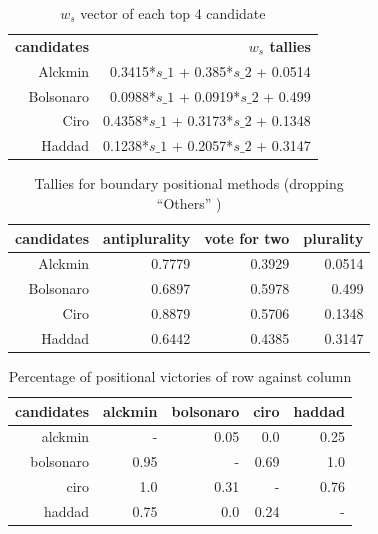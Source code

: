 \documentclass[hidelinks,11pt]{article}
\begin{document}
\begin{table}
  \centering
  \begin{tabular}{rr}
    \hline\hline
    \textbf{candidates} & \textbf{\(w_s\) tallies} \\
    Alckmin & 0.3415*\(s\_1\) + 0.385*\(s\_2\) + 0.0514 \\
    Bolsonaro & 0.0988*\(s\_1\) + 0.0919*\(s\_2\) + 0.499 \\
    Ciro & 0.4358*\(s\_1\) + 0.3173*\(s\_2\) + 0.1348 \\
    Haddad & 0.1238*\(s\_1\) + 0.2057*\(s\_2\) + 0.3147 \\\hline\hline
  \end{tabular}
  \caption{\(w_{s}\) vector of each top 4 candidate}
\end{table}


\begin{table}[]
    \centering
\begin{tabular}{|r|r|r|r|}
\hline
\textbf{candidates} & \textbf{antiplurality} & \textbf{vote for two} & \textbf{plurality} \\ \hline
Alckmin             & 0.7779                 & 0.3929                & 0.0514             \\ \hline
Bolsonaro           & 0.6897                 & 0.5978                & 0.499              \\ \hline
Ciro                & 0.8879                 & 0.5706                & 0.1348             \\ \hline
Haddad              & 0.6442                 & 0.4385                & 0.3147             \\ \hline
\end{tabular}
\caption{Tallies for boundary positional methods (dropping ``Others'' )}
\end{table}




\begin{table}[]
  \centering
\begin{tabular}{|r|r|r|r|r|}
\hline
\textbf{candidates} & \textbf{alckmin} & \textbf{bolsonaro} & \textbf{ciro} & \textbf{haddad} \\ \hline
alckmin             & -             & 0.05               & 0.0           & 0.25            \\ \hline
bolsonaro           & 0.95             & -            & 0.69          & 1.0             \\ \hline
ciro                & 1.0              & 0.31               & -           & 0.76            \\ \hline
haddad              & 0.75             & 0.0                & 0.24          & -            \\ \hline
\end{tabular}
\caption{Percentage of positional victories of row against column}
\end{table}
\end{document}
